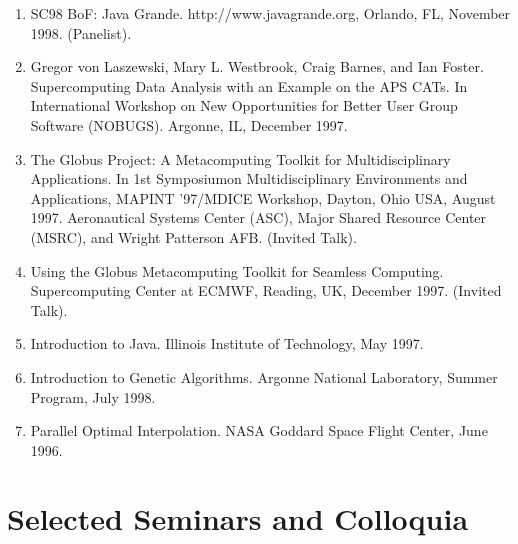 \documentclass{article}
\begin{document}
\begin{enumerate}
\item  SC98 BoF: Java Grande. http://www.javagrande.org, Orlando, FL, November 1998. (Panelist). 
\item  Gregor von Laszewski, Mary L. Westbrook, Craig Barnes, and Ian Foster. Supercomputing Data Analysis with an Example on the APS CATs. In International Workshop on New Opportunities for Better User Group Software (NOBUGS). Argonne, IL, December 1997.  
\item  The Globus Project: A Metacomputing Toolkit for Multidisciplinary Applications. In 1st Symposiumon Multidisciplinary Environments and Applications, MAPINT '97/MDICE Workshop, Dayton, Ohio USA, August 1997. Aeronautical Systems Center (ASC), Major Shared Resource Center (MSRC), and Wright Patterson AFB. (Invited Talk). 
\item  Using the Globus Metacomputing Toolkit for Seamless Computing. Supercomputing Center at ECMWF, Reading, UK, December 1997. (Invited Talk). 
\item  Introduction to Java. Illinois Institute of Technology, May 1997. 
\item  Introduction to Genetic Algorithms. Argonne National Laboratory, Summer Program, July 1998. 
\item  Parallel Optimal Interpolation. NASA Goddard Space Flight Center, June 1996. 
\end{enumerate}
 
\section{Selected Seminars and Colloquia}
\end{document}
